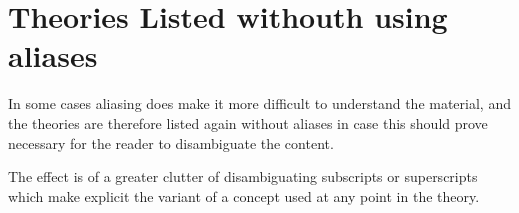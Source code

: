 {
\let\Section\subsection
\let\Subsection\subsubsection
\def\subsection#1{\Subsection*{#1}}

\pagebreak
\def\section#1{\Section{#1}\label{t045}}

\pagebreak
\def\section#1{\Section{#1}\label{t045q}}

\pagebreak
\def\section#1{\Section{#1}\label{t045k}}

\pagebreak
\def\section#1{\Section{#1}\label{t045w}}

}  %

\pagebreak
\section{Theories Listed withouth using aliases}\label{TheoryListingsWithoutAliases}

In some cases aliasing does make it more difficult to understand the material, and the theories are therefore listed again without aliases in case this should prove necessary for the reader to disambiguate the content.

The effect is of a greater clutter of disambiguating subscripts or superscripts which make explicit the variant of a concept used at any point in the theory.


